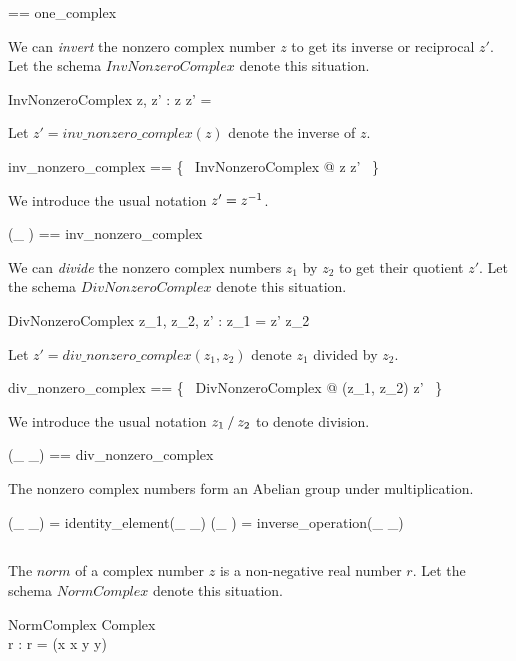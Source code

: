 \documentclass[11pt, oneside]{article}
\begin{document}
\begin{zed}
	\oneC == one\_complex
\end{zed}

We can \textit{invert}
the nonzero complex number $z$ to get its inverse or reciprocal $z'$.
Let the schema $InvNonzeroComplex$ denote this situation.

\begin{schema}{InvNonzeroComplex}
	z, z' : \Cnz
\where
	z \mulCnz z' = \oneC
\end{schema}

Let $z' = inv\_nonzero\_complex(z)$ denote the inverse of $z$.

\begin{zed}
	inv\_nonzero\_complex == \{~ InvNonzeroComplex @ z \mapsto z' ~\}
\end{zed}

We introduce the usual notation $z' = z ^{-1}$.

\begin{zed}
	(\_ \invCnz) == inv\_nonzero\_complex
\end{zed}

We can \textit{divide} the nonzero complex numbers $z_1$ by $z_2$ to get their quotient $z'$.
Let the schema $DivNonzeroComplex$ denote this situation.

\begin{schema}{DivNonzeroComplex}
	z_1, z_2, z' : \Cnz
\where
	z_1 = z' \mulCnz z_2
\end{schema}

Let $z' = div\_nonzero\_complex(z_1, z_2)$ denote $z_1$ divided by $z_2$.

\begin{zed}
	div\_nonzero\_complex == \{~ DivNonzeroComplex @ (z_1, z_2) \mapsto z' ~\}
\end{zed}

We introduce the usual notation $z_1 \mathbin{/} z_2$ to denote division.

\begin{zed}
	(\_ \divCnz \_) == div\_nonzero\_complex
\end{zed}

The nonzero complex numbers form an Abelian group under multiplication.

\begin{zed}
(\_ \mulCnz \_) \in \abgroup \Cnz
\also
\oneC = identity\_element(\_ \mulCnz \_)
\also
(\_ \invCnz) = inverse\_operation(\_ \mulCnz \_)
\end{zed}

\subsection{}

The $norm$ of a complex number $z$ is a non-negative real number $r$.
Let the schema $NormComplex$ denote this situation.

\begin{schema}{NormComplex}
	Complex \\
	r : \R
\where
	r = \sqrtR(x \mulR x \addR y \mulR y)
\end{schema}

\printbibliography
\end{document}
